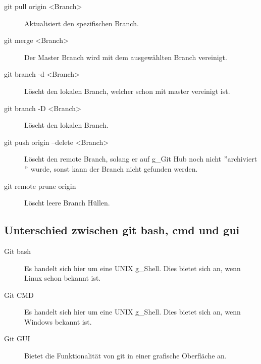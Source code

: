 \begin{description}
	\item[git pull origin <Branch>] Aktualisiert den spezifischen Branch.
	\item[git merge <Branch>] Der Master Branch wird mit dem ausgewählten Branch vereinigt.
	\item[git branch -d <Branch>] Löscht den lokalen Branch, welcher schon mit master vereinigt ist.
	\item[git branch -D <Branch>] Löscht den lokalen Branch.
	\item[git push origin  --delete <Branch>] Löscht den remote Branch, solang er auf \gls{g_Git} Hub noch nicht $"$archiviert$"$ wurde, sonst kann der Branch nicht gefunden werden. 
	\item[git remote prune origin] Löscht leere Branch Hüllen.
\end{description}

\subsection{Unterschied zwischen git bash, cmd und gui}
\begin{description}
	\item[Git bash] Es handelt sich hier um eine UNIX \gls{g_Shell}. Dies bietet sich an, wenn Linux schon bekannt ist.
	\item[Git CMD] Es handelt sich hier um eine UNIX \gls{g_Shell}. Dies bietet sich an, wenn Windows bekannt ist.
	\item[Git GUI] Bietet die Funktionalität von git in einer grafische Oberfläche an.
\end{description} \cite{stackoverflow.Diff}

